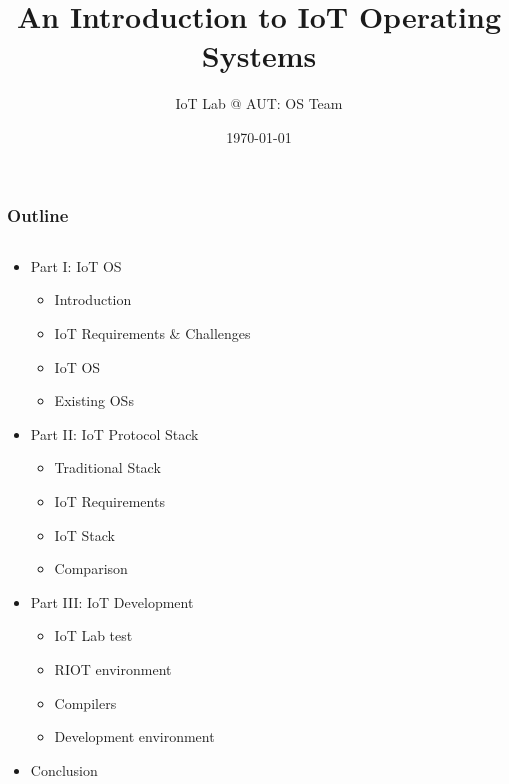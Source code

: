 \documentclass{beamer}
\title[Operating Systems of the IoT]{An Introduction to IoT Operating Systems}
\author{IoT Lab @ AUT: OS Team}
\institute[] {
  Amirkabir University of Technology \\
  \medskip
  {\small\tt elahejalalpoor@gmail.com}\\
  {\small\tt parham.alvani@gmail.com}
  \medskip
}
\date{\today}
\begin{document}
\begin{frame}
\titlepage
\end{frame}


\begin{frame}
	\frametitle{Outline}
	\begin{columns}[c]
		\begin{column}{30cm}
			\vspace{.1cm}
			\begin{itemize}
				\justifying
				\item Part I: IoT OS
				\begin{itemize}
					\item<2-> Introduction
					\item<2-> IoT Requirements \& Challenges
					\item<2-> IoT OS
					\item<2-> Existing OSs				
				\end{itemize}
				\item Part II: IoT Protocol Stack
				\begin{itemize}
					\item<3-> Traditional Stack
					\item<3-> IoT Requirements
					\item<3-> IoT Stack
					\item<3-> Comparison
				\end{itemize}
				\item Part III: IoT Development
				\begin{itemize}
					\item<4-> IoT Lab test
					\item<4-> RIOT environment
					\item<4-> Compilers
					\item<4-> Development environment
				\end{itemize}
				\item Conclusion
			\end{itemize}
		\end{column}
	\end{columns}
\end{frame}
\end{document}
